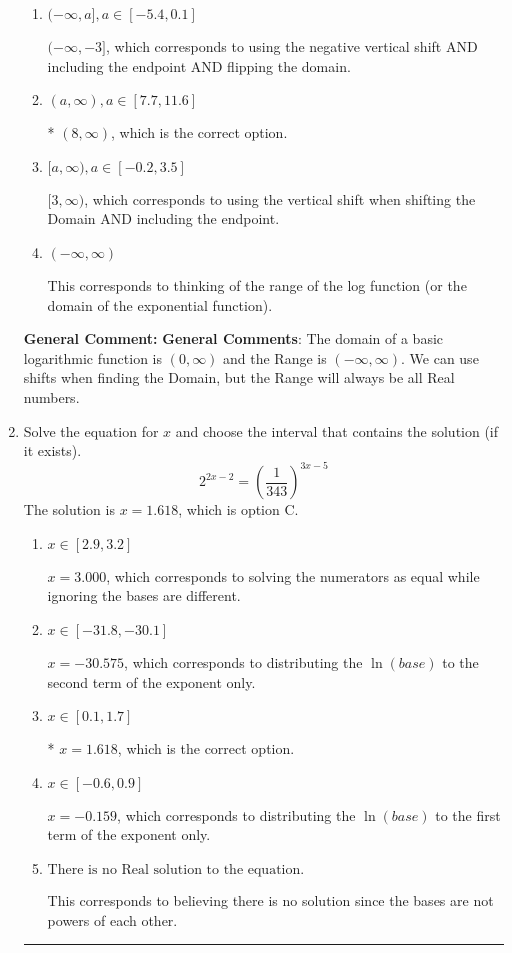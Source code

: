 \documentclass{extbook}[14pt]
\newcommand{\litem}[1]{\item #1

\rule{\textwidth}{0.4pt}}
\begin{document}
\begin{enumerate}
{\begin{enumerate}[label=\Alph*.]
$(-\infty, -8)$, which corresponds to flipping the Domain. Remember: the general for is $a*\log(x-h)+k$, \textbf{where $a$ does not affect the domain}.
\item \( (-\infty, a], a \in [-5.4, 0.1] \)

$(-\infty, -3]$, which corresponds to using the negative vertical shift AND including the endpoint AND flipping the domain.
\item \( (a, \infty), a \in [7.7, 11.6] \)

* $(8, \infty)$, which is the correct option.
\item \( [a, \infty), a \in [-0.2, 3.5] \)

$[3, \infty)$, which corresponds to using the vertical shift when shifting the Domain AND including the endpoint.
\item \( (-\infty, \infty) \)

This corresponds to thinking of the range of the log function (or the domain of the exponential function).
\end{enumerate}

\textbf{General Comment:} \textbf{General Comments}: The domain of a basic logarithmic function is $(0, \infty)$ and the Range is $(-\infty, \infty)$. We can use shifts when finding the Domain, but the Range will always be all Real numbers.
}
\litem{
Solve the equation for $x$ and choose the interval that contains the solution (if it exists).
\[ 2^{2x-2} = \left(\frac{1}{343}\right)^{3x-5} \]The solution is \( x = 1.618 \), which is option C.\begin{enumerate}[label=\Alph*.]
\item \( x \in [2.9, 3.2] \)

$x = 3.000$, which corresponds to solving the numerators as equal while ignoring the bases are different.
\item \( x \in [-31.8, -30.1] \)

$x = -30.575$, which corresponds to distributing the $\ln(base)$ to the second term of the exponent only.
\item \( x \in [0.1, 1.7] \)

* $x = 1.618$, which is the correct option.
\item \( x \in [-0.6, 0.9] \)

$x = -0.159$, which corresponds to distributing the $\ln(base)$ to the first term of the exponent only.
\item \( \text{There is no Real solution to the equation.} \)

This corresponds to believing there is no solution since the bases are not powers of each other.
\end{enumerate}

}
\end{enumerate}
\end{document}

